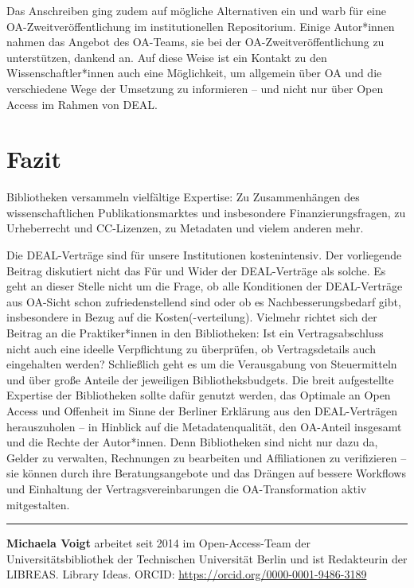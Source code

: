 \documentclass[a4paper,
fontsize=11pt,
oneside,
numbers=noperiodatend,
parskip=half-,
bibliography=totoc,
final
]{scrartcl}
\begin{document}
Das Anschreiben ging zudem auf mögliche Alternativen ein und warb für
eine OA-Zweitveröf\-fentlichung im institutionellen Repositorium. Einige
Autor*innen nahmen das Angebot des OA-Teams, sie bei der
OA-Zweitveröffentlichung zu unterstützen, dankend an. Auf diese Weise
ist ein Kontakt zu den Wissenschaftler*innen auch eine Möglichkeit, um
allgemein über OA und die verschiedene Wege der Umsetzung zu informieren
-- und nicht nur über Open Access im Rahmen von DEAL.

\hypertarget{fazit}{%
\section{Fazit}\label{fazit}}

Bibliotheken versammeln vielfältige Expertise: Zu Zusammenhängen des
wissenschaftlichen Publikationsmarktes und insbesondere
Finanzierungsfragen, zu Urheberrecht und CC-Lizenzen, zu Metadaten und
vielem anderen mehr.

Die DEAL-Verträge sind für unsere Institutionen kostenintensiv. Der
vorliegende Beitrag diskutiert nicht das Für und Wider der DEAL-Verträge
als solche. Es geht an dieser Stelle nicht um die Frage, ob alle
Konditionen der DEAL-Verträge aus OA-Sicht schon zufriedenstellend sind
oder ob es Nachbesserungsbedarf gibt, insbesondere in Bezug auf die
Kosten(-verteilung). Vielmehr richtet sich der Beitrag an die
Praktiker*innen in den Bibliotheken: Ist ein Vertragsabschluss nicht
auch eine ideelle Verpflichtung zu überprüfen, ob Vertragsdetails auch
eingehalten werden? Schließlich geht es um die Verausgabung von
Steuermitteln und über große Anteile der jeweiligen Bibliotheksbudgets.
Die breit aufgestellte Expertise der Bibliotheken sollte dafür genutzt
werden, das Optimale an Open Access und Offenheit im Sinne der Berliner
Erklärung aus den DEAL-Verträgen herauszuholen -- in Hinblick auf die
Metadatenqualität, den OA-Anteil insgesamt und die Rechte der
Autor*innen. Denn Bibliotheken sind nicht nur dazu da, Gelder zu
verwalten, Rechnungen zu bearbeiten und Affiliationen zu verifizieren --
sie können durch ihre Beratungsangebote und das Drängen auf bessere
Workflows und Einhaltung der Vertragsvereinbarungen die
OA-Transformation aktiv mitgestalten.

\begin{center}\rule{0.5\linewidth}{0.5pt}\end{center}

\textbf{Michaela Voigt} arbeitet seit 2014 im Open-Access-Team der
Universitätsbibliothek der Technischen Universität Berlin und ist
Redakteurin der LIBREAS. Library Ideas. ORCID:
\url{https://orcid.org/0000-0001-9486-3189}
\end{document}
